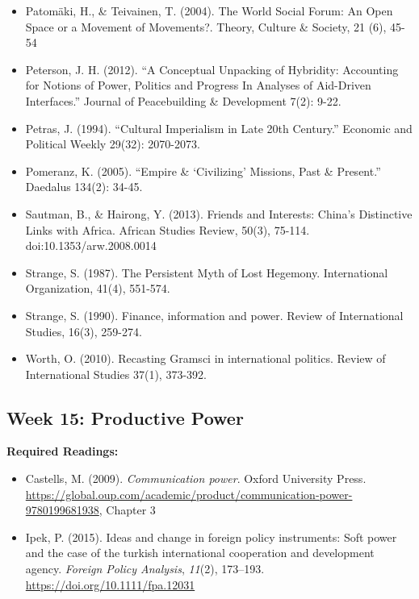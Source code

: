 \documentclass[
  letterpaper,
  DIV=11,
  numbers=noendperiod]{scrartcl}
\providecommand{\tightlist}{%
  \setlength{\itemsep}{0pt}\setlength{\parskip}{0pt}}\usepackage{longtable,booktabs,array}
\begin{document}
\begin{itemize}
  National Security Strategy. Journal of International Relations and
  Development. doi:10.1057/s41268-016-0074-9
\item
  Patomäki, H., \& Teivainen, T. (2004). The World Social Forum: An Open
  Space or a Movement of Movements?. Theory, Culture \& Society, 21 (6),
  45-54
\item
  Peterson, J. H. (2012). ``A Conceptual Unpacking of Hybridity:
  Accounting for Notions of Power, Politics and Progress In Analyses of
  Aid-Driven Interfaces.'' Journal of Peacebuilding \& Development 7(2):
  9-22.
\item
  Petras, J. (1994). ``Cultural Imperialism in Late 20th Century.''
  Economic and Political Weekly 29(32): 2070-2073.
\item
  Pomeranz, K. (2005). ``Empire \& `Civilizing' Missions, Past \&
  Present.'' Daedalus 134(2): 34-45.
\item
  Sautman, B., \& Hairong, Y. (2013). Friends and Interests: China's
  Distinctive Links with Africa. African Studies Review, 50(3), 75-114.
  doi:10.1353/arw.2008.0014
\item
  Strange, S. (1987). The Persistent Myth of Lost Hegemony.
  International Organization, 41(4), 551-574.
\item
  Strange, S. (1990). Finance, information and power. Review of
  International Studies, 16(3), 259-274.
\item
  Worth, O. (2010). Recasting Gramsci in international politics. Review
  of International Studies 37(1), 373-392.
\end{itemize}

\hypertarget{week-15-productive-power}{%
\subsection*{Week 15: Productive Power}\label{week-15-productive-power}}

\textbf{Required Readings:}

\begin{itemize}
\tightlist
\item
  Castells, M. (2009). \emph{Communication power}. Oxford University
  Press.
  \url{https://global.oup.com/academic/product/communication-power-9780199681938},
  Chapter 3
\item
  Ipek, P. (2015). Ideas and change in foreign policy instruments: Soft
  power and the case of the turkish international cooperation and
  development agency. \emph{Foreign Policy Analysis}, \emph{11}(2),
  173--193. \url{https://doi.org/10.1111/fpa.12031}
\end{itemize}
\end{document}
